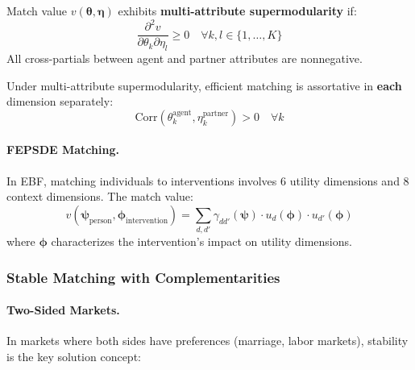 \begin{definition}
\label{def:multi-super}
Match value $v(\boldsymbol{\theta}, \boldsymbol{\eta})$ exhibits 
\textbf{multi-attribute supermodularity} if:
\begin{equation}
\frac{\partial^2 v}{\partial \theta_k \partial \eta_l} \geq 0 \quad 
\forall k, l \in \{1, \ldots, K\}
\end{equation}
All cross-partials between agent and partner attributes are nonnegative.
\end{definition}

\begin{proposition}
\label{prop:dimension-assort}
Under multi-attribute supermodularity, efficient matching is assortative in 
\textbf{each} dimension separately:
\begin{equation}
\text{Corr}(\theta_k^{\text{agent}}, \eta_k^{\text{partner}}) > 0 \quad \forall k
\end{equation}
\end{proposition}

\paragraph{FEPSDE Matching.}

In EBF, matching individuals to interventions involves 6 utility dimensions 
and 8 context dimensions. The match value:
\begin{equation}
v(\boldsymbol{\psi}_{\text{person}}, \boldsymbol{\phi}_{\text{intervention}}) = 
\sum_{d,d'} \gamma_{dd'}(\boldsymbol{\psi}) \cdot u_d(\boldsymbol{\phi}) \cdot u_{d'}(\boldsymbol{\phi})
\end{equation}
where $\boldsymbol{\phi}$ characterizes the intervention's impact on utility dimensions.

\subsubsection{Stable Matching with Complementarities}

\paragraph{Two-Sided Markets.}

In markets where both sides have preferences (marriage, labor markets), stability 
is the key solution concept:

